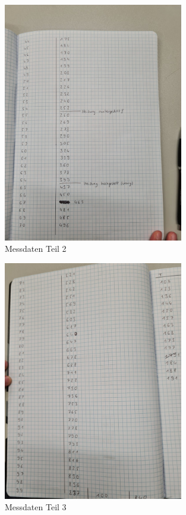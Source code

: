 \begin{figure}
    \centering
    \includegraphics[width=0.7\textwidth]{Messdaten2.jpg}
    \caption{Messdaten Teil 2}
    \label{fig:M1}
\end{figure}

\begin{figure}
  \centering
  \includegraphics[width=0.7\textwidth]{Messdaten3.jpg}
  \caption{Messdaten Teil 3}
  \label{fig:M1}
\end{figure}